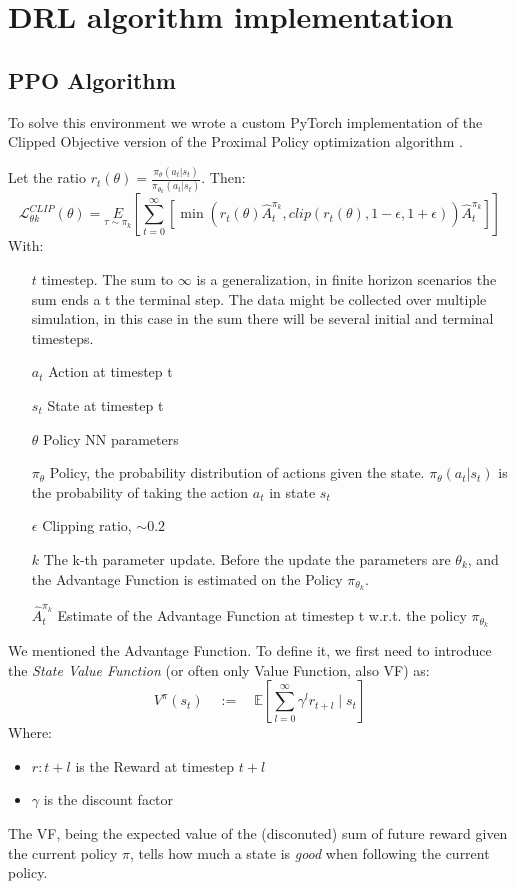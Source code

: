 \documentclass{svproc}
\begin{document}
\section{DRL algorithm implementation}
\subsection{PPO Algorithm}
To solve this environment we wrote a custom PyTorch \cite{paszke2017PyTorch} implementation of the Clipped Objective version of the Proximal Policy optimization algorithm \cite{Schulman2017PPO}.

Let the ratio $r_t(\theta) = \frac{\pi_\theta(a_t|s_t)}{\pi_{\theta_k}(a_t|s_t)} $. Then:
\begin{equation} \label{eq:PPO_clip}
    \mathcal{L}_{\theta k}^{CLIP}(\theta) = \underset{\tau\sim\pi_k}{E}\left[\sum_{t=0}^\infty\left[\min\left(r_t(\theta)\hat{A}_t^{\pi_k}, clip\left(r_t(\theta), 1-\epsilon, 1+\epsilon\right)\right)\hat{A}_t^{\pi_k}\right]\right] 
\end{equation}
With:
\begin{itemize}
    \item[$t$]{timestep. The sum to $\infty$ is a generalization, in finite horizon scenarios the sum ends a t the terminal step. The data might be collected over multiple simulation, in this case in the sum there will be several initial and terminal timesteps.}
    \item[$a_t$]{Action at timestep t}
    \item[$s_t$]{State at timestep t}
    \item[$\theta$]{Policy NN parameters}
    \item[$\pi_\theta$]{Policy, the probability distribution of actions given the state. $\pi_\theta(a_t|s_t)$ is the probability of taking the action $a_t$ in state $s_t$}
    \item[$\epsilon$]{Clipping ratio, $\sim 0.2$}
    \item[$k$]{The k-th parameter update. Before the update the parameters are $\theta_k$, and the Advantage Function is estimated on the Policy $\pi_{\theta_k}$}.
    \item[$\hat{A}_t^{\pi_k}$]{Estimate of the Advantage Function at timestep t w.r.t. the policy $\pi_{\theta_k}$}
\end{itemize}
We mentioned the Advantage Function. To define it, we first need to introduce the \textit{State Value Function} (or often only Value Function, also VF) as:
\begin{equation} \label{eq:stateVF}
    V^\pi(s_t) \quad := \quad \mathbb{ E} \left[ \sum_{l=0}^\infty \gamma^l r_{t+l} \;|\; s_t \right] 
\end{equation}
Where:
\begin{itemize}
    \item $r:{t+l}$ is the Reward at timestep $t+l$
    \item $\gamma$ is the discount factor
\end{itemize}
The VF, being the expected value of the (disconuted) sum of future reward given the current policy $\pi$, tells how much a state is \textit{good} when following the current policy.
\end{document}
